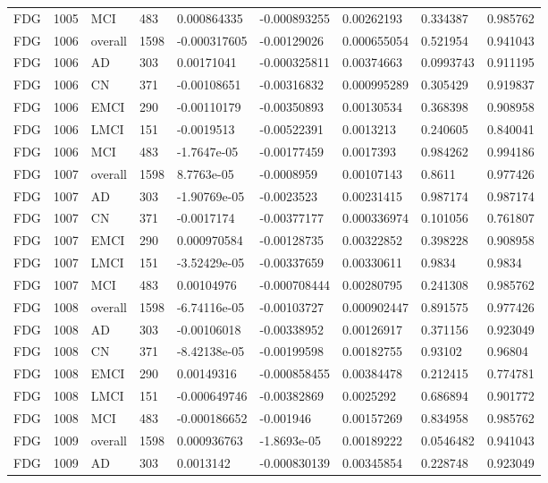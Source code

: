 \begin{landscape}
\begin{longtable}{lllllllll}
FDG & 1005 & MCI & 483 & 0.000864335 & -0.000893255 & 0.00262193 & 0.334387 & 0.985762 \\
FDG & 1006 & overall & 1598 & -0.000317605 & -0.00129026 & 0.000655054 & 0.521954 & 0.941043 \\
FDG & 1006 & AD & 303 & 0.00171041 & -0.000325811 & 0.00374663 & 0.0993743 & 0.911195 \\
FDG & 1006 & CN & 371 & -0.00108651 & -0.00316832 & 0.000995289 & 0.305429 & 0.919837 \\
FDG & 1006 & EMCI & 290 & -0.00110179 & -0.00350893 & 0.00130534 & 0.368398 & 0.908958 \\
FDG & 1006 & LMCI & 151 & -0.0019513 & -0.00522391 & 0.0013213 & 0.240605 & 0.840041 \\
FDG & 1006 & MCI & 483 & -1.7647e-05 & -0.00177459 & 0.0017393 & 0.984262 & 0.994186 \\
FDG & 1007 & overall & 1598 & 8.7763e-05 & -0.0008959 & 0.00107143 & 0.8611 & 0.977426 \\
FDG & 1007 & AD & 303 & -1.90769e-05 & -0.0023523 & 0.00231415 & 0.987174 & 0.987174 \\
FDG & 1007 & CN & 371 & -0.0017174 & -0.00377177 & 0.000336974 & 0.101056 & 0.761807 \\
FDG & 1007 & EMCI & 290 & 0.000970584 & -0.00128735 & 0.00322852 & 0.398228 & 0.908958 \\
FDG & 1007 & LMCI & 151 & -3.52429e-05 & -0.00337659 & 0.00330611 & 0.9834 & 0.9834 \\
FDG & 1007 & MCI & 483 & 0.00104976 & -0.000708444 & 0.00280795 & 0.241308 & 0.985762 \\
FDG & 1008 & overall & 1598 & -6.74116e-05 & -0.00103727 & 0.000902447 & 0.891575 & 0.977426 \\
FDG & 1008 & AD & 303 & -0.00106018 & -0.00338952 & 0.00126917 & 0.371156 & 0.923049 \\
FDG & 1008 & CN & 371 & -8.42138e-05 & -0.00199598 & 0.00182755 & 0.93102 & 0.96804 \\
FDG & 1008 & EMCI & 290 & 0.00149316 & -0.000858455 & 0.00384478 & 0.212415 & 0.774781 \\
FDG & 1008 & LMCI & 151 & -0.000649746 & -0.00382869 & 0.0025292 & 0.686894 & 0.901772 \\
FDG & 1008 & MCI & 483 & -0.000186652 & -0.001946 & 0.00157269 & 0.834958 & 0.985762 \\
FDG & 1009 & overall & 1598 & 0.000936763 & -1.8693e-05 & 0.00189222 & 0.0546482 & 0.941043 \\
FDG & 1009 & AD & 303 & 0.0013142 & -0.000830139 & 0.00345854 & 0.228748 & 0.923049 \\

\end{longtable}
\end{landscape}
